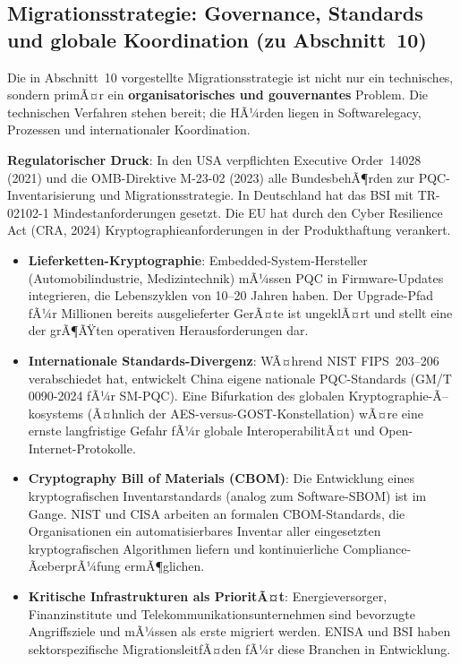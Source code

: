 ﻿\documentclass[a4paper,12pt]{article}
\theoremstyle{definition}
\begin{document}
\subsection{Migrationsstrategie: Governance, Standards und globale Koordination (zu Abschnitt~10)}

Die in Abschnitt~10 vorgestellte Migrationsstrategie ist nicht nur
ein technisches, sondern primÃ¤r ein \textbf{organisatorisches und
gouvernantes} Problem. Die technischen Verfahren stehen bereit;
die HÃ¼rden liegen in Softwarelegacy, Prozessen und internationaler
Koordination.

\textbf{Regulatorischer Druck}: In den USA verpflichten
Executive Order~14028 (2021) und die OMB-Direktive M-23-02 (2023)
alle BundesbehÃ¶rden zur PQC-Inventarisierung und Migrationsstrategie.
In Deutschland hat das BSI mit TR-02102-1 \cite{BSI24}
Mindestanforderungen gesetzt. Die EU hat durch den
Cyber Resilience Act (CRA, 2024) Kryptographieanforderungen
in der Produkthaftung verankert.

\begin{itemize}
  \item \textbf{Lieferketten-Kryptographie}:
    Embedded-System-Hersteller (Automobilindustrie, Medizintechnik)
    mÃ¼ssen PQC in Firmware-Updates integrieren, die Lebenszyklen
    von 10--20 Jahren haben. Der Upgrade-Pfad fÃ¼r Millionen bereits
    ausgelieferter GerÃ¤te ist ungeklÃ¤rt und stellt eine der
    grÃ¶ÃŸten operativen Herausforderungen dar.
  \item \textbf{Internationale Standards-Divergenz}:
    WÃ¤hrend NIST FIPS~203--206 verabschiedet hat, entwickelt China
    eigene nationale PQC-Standards (GM/T 0090-2024 fÃ¼r SM-PQC).
    Eine Bifurkation des globalen Kryptographie-Ã–kosystems
    (Ã¤hnlich der AES-versus-GOST-Konstellation) wÃ¤re eine
    ernste langfristige Gefahr fÃ¼r globale InteroperabilitÃ¤t
    und Open-Internet-Protokolle.
  \item \textbf{Cryptography Bill of Materials (CBOM)}:
    Die Entwicklung eines kryptografischen Inventarstandards
    (analog zum Software-SBOM) ist im Gange. NIST und CISA
    arbeiten an formalen CBOM-Standards, die Organisationen
    ein automatisierbares Inventar aller eingesetzten
    kryptografischen Algorithmen liefern und kontinuierliche
    Compliance-ÃœberprÃ¼fung ermÃ¶glichen.
  \item \textbf{Kritische Infrastrukturen als PrioritÃ¤t}:
    Energieversorger, Finanzinstitute und
    Telekommunikationsunternehmen sind bevorzugte Angriffsziele
    und mÃ¼ssen als erste migriert werden.
    ENISA und BSI haben sektorspezifische MigrationsleitfÃ¤den
    fÃ¼r diese Branchen in Entwicklung.
\end{itemize}
\end{document}
